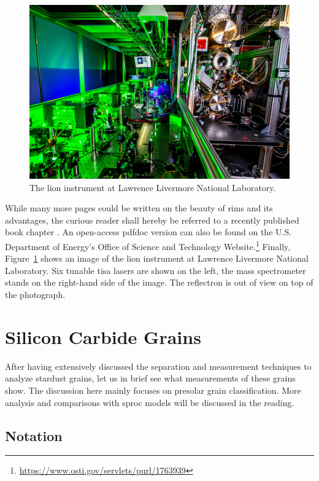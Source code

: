 \begin{figure}[tb]
    \centering
    \includegraphics[width=\textwidth]{graphics/stardust/lion}
    \caption{The \ac{lion} instrument at Lawrence Livermore National Laboratory.}
    \label{fig:stardust:lion_photo}
\end{figure}
While many more pages could be written on the beauty of \ac{rims} and its advantages, the curious reader shall hereby be referred to a recently published book chapter \citep{savina21}. An open-access \ac{pdfdoc} version can also be found on the U.S. Department of Energy's Office of Science and Technology Website.\footnote{\url{https://www.osti.gov/servlets/purl/1763939}} Finally, Figure~\ref{fig:stardust:lion_photo} shows an image of the \ac{lion} instrument at Lawrence Livermore National Laboratory. Six tunable \ac{tisa} lasers are shown on the left, the mass spectrometer stands on the right-hand side of the image. The reflectron is out of view on top of the photograph.




\section{Silicon Carbide Grains} \label{sec:stardust:sic_grains}

After having extensively discussed the separation and measurement techniques to analyze stardust grains, let us in brief see what measurements of these grains show. The discussion here mainly focuses on presolar grain classification. More analysis and comparisons with \ac{sproc} models will be discussed in the reading.


\subsection{Notation}

